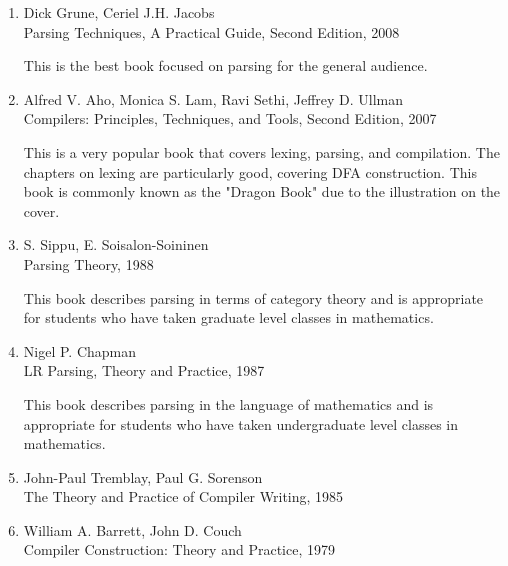 \documentclass{book}
\begin{document}
\begin{enumerate}
    \item Dick Grune, Ceriel J.H. Jacobs\\
    Parsing Techniques, A Practical Guide, Second Edition, 2008

    This is the best book focused on parsing for the general audience.

    \item Alfred V. Aho, Monica S. Lam, Ravi Sethi, Jeffrey D. Ullman\\
    Compilers: Principles, Techniques, and Tools, Second Edition, 2007

    This is a very popular book that covers lexing, parsing, and compilation.
    The chapters on lexing are particularly good, covering DFA construction.
    This book is commonly known as the "Dragon Book" due to the illustration on the cover.

    \item S. Sippu, E. Soisalon-Soininen\\
    Parsing Theory, 1988

    This book describes parsing in terms of category theory and is appropriate for
    students who have taken graduate level classes in mathematics.

    \item Nigel P. Chapman\\
    LR Parsing, Theory and Practice, 1987

    This book describes parsing in the language of mathematics and is appropriate
    for students who have taken undergraduate level classes in mathematics.
    
    \item John-Paul Tremblay, Paul G. Sorenson\\
    The Theory and Practice of Compiler Writing, 1985

    \item William A. Barrett, John D. Couch\\
    Compiler Construction: Theory and Practice, 1979
\end{enumerate}
\end{document}
